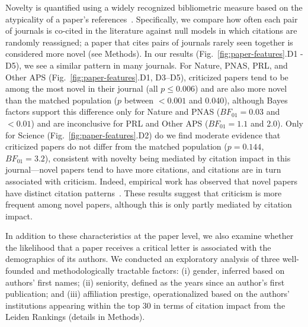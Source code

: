 \documentclass[12pt,a4paper]{article}
\numberwithin{equation}{section}
\def\methods{Methods}
\begin{document}
Novelty is quantified using a widely recognized bibliometric measure based on the atypicality of a paper's references~\cite{uzzi_2013_atypical}.
Specifically, we compare how often each pair of journals is co-cited in the literature against null models in which citations are randomly reassigned; a paper that cites pairs of journals rarely seen together is considered more novel (see \methods).
In our results (Fig.~\ref*{fig:paper-features}.D1 - D5), we see a similar pattern in many journals.
For Nature, PNAS, PRL, and Other APS (Fig.~\ref*{fig:paper-features}.D1, D3--D5), criticized papers tend to be among the most novel in their journal (all $p \le 0.006$) and are also more novel than the matched population ($p$ between $< 0.001$ and 0.040), although Bayes factors support this difference only for Nature and PNAS ($BF_{01} = 0.03$ and $< 0.01$) and are inconclusive for PRL and Other APS ($BF_{01} = 1.1$ and 2.0).
Only for Science (Fig.~\ref*{fig:paper-features}.D2) do we find moderate evidence that criticized papers do not differ from the matched population ($p = 0.144$, $BF_{01} = 3.2$), consistent with novelty being mediated by citation impact in this journal---novel papers tend to have more citations, and citations are in turn associated with criticism. 
Indeed, empirical work has observed that novel papers have distinct citation patterns~\cite{wang_2017_novelty}.
These results suggest that criticism is more frequent among novel papers, although this is only partly mediated by citation impact.

In addition to these characteristics at the paper level, we also examine whether the likelihood that a paper receives a critical letter is associated with the demographics of its authors. 
We conducted an exploratory analysis of three well-founded and methodologically tractable factors: (i) gender, inferred based on authors' first names;
(ii) seniority, defined as the years since an author's first publication; 
and (iii) affiliation prestige, operationalized based on the authors' institutions appearing within the top 30 in terms of citation impact from the Leiden Rankings (details in \methods).
\end{document}
